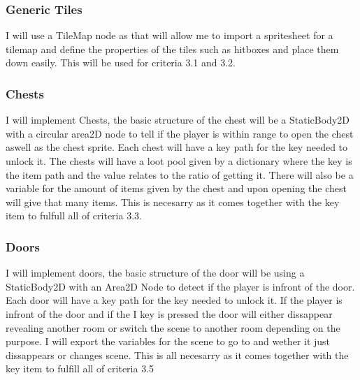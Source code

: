 \documentclass{article}
\begin{document}
        \subsubsection{Generic Tiles}
        I will use a TileMap node as that will allow me to import a spritesheet for a tilemap and define the properties of the tiles such as hitboxes and place them down easily. This will be used for criteria 3.1 and 3.2.\\
        \subsubsection{Chests}
        I will implement Chests, the basic structure of the chest will be a StaticBody2D with a circular area2D node to tell if the player is within range to open the chest aswell as the chest sprite. Each chest will have a key path for the key needed to unlock it. The chests will have a loot pool given by a dictionary where the key is the item path and the value relates to the ratio of getting it. There will also be a variable for the amount of items given by the chest and upon opening the chest will give that many items. This is necesarry as it comes together with the key item to fulfull all of criteria 3.3.\\
        \subsubsection{Doors}
        I will implement doors, the basic structure of the door will be using a StaticBody2D with an Area2D Node to detect if the player is infront of the door. Each door will have a key path for the key needed to unlock it. If the player is infront of the door and if the I key is pressed the door will either dissappear revealing another room or switch the scene to another room depending on the purpose. I will export the variables for the scene to go to and wether it just dissappears or changes scene. This is all necesarry as it comes together with the key item to fulfill all of criteria 3.5\\
\end{document}
